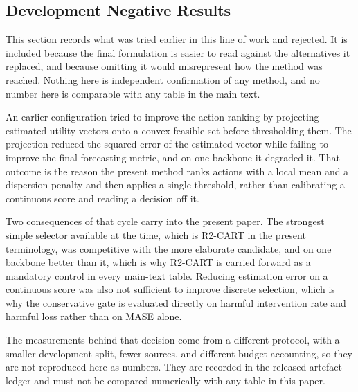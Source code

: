 \documentclass{article}
\begin{document}
\subsection{Development Negative Results}
\label{app:development}
This section records what was tried earlier in this line of work and rejected. It is included
because the final formulation is easier to read against the alternatives it replaced, and
because omitting it would misrepresent how the method was reached. Nothing here is independent
confirmation of any method, and no number here is comparable with any table in the main text.

An earlier configuration tried to improve the action ranking by projecting estimated utility
vectors onto a convex feasible set before thresholding them. The projection reduced the squared
error of the estimated vector while failing to improve the final forecasting metric, and on one
backbone it degraded it. That outcome is the reason the present method ranks actions with a
local mean and a dispersion penalty and then applies a single threshold, rather than
calibrating a continuous score and reading a decision off it.

Two consequences of that cycle carry into the present paper. The strongest simple selector
available at the time, which is R2-CART in the present terminology, was competitive with the
more elaborate candidate, and on one backbone better than it, which is why R2-CART is carried
forward as a mandatory control in every main-text table. Reducing estimation error on a
continuous score was also not sufficient to improve discrete selection, which is why the
conservative gate is evaluated directly on harmful intervention rate and harmful loss rather
than on MASE alone.

The measurements behind that decision come from a different protocol, with a smaller
development split, fewer sources, and different budget accounting, so they are not reproduced
here as numbers. They are recorded in the released artefact ledger and must not be compared
numerically with any table in this paper.
\end{document}

